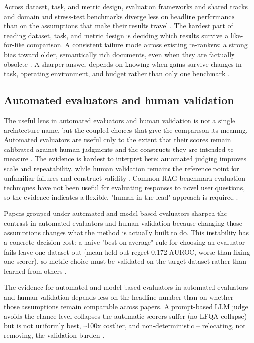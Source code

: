 \documentclass[a4paper,11pt]{article}
\begin{document}
Across dataset, task, and metric design, evaluation frameworks and shared tracks and domain and stress-test benchmarks diverge less on headline performance than on the assumptions that make their results travel \citep{Guder2026Rage,SaadFalcon2023Ares,Yao2026Authoritybench,Li2026Mrag}. The hardest part of reading dataset, task, and metric design is deciding which results survive a like-for-like comparison. A consistent failure mode across existing re-rankers: a strong bias toward older, semantically rich documents, even when they are factually obsolete \citep{An2026Fresco}. A sharper answer depends on knowing when gains survive changes in task, operating environment, and budget rather than only one benchmark \citep{Guder2026Rage,SaadFalcon2023Ares}.
\subsection{Automated evaluators and human validation}


The useful lens in automated evaluators and human validation is not a single architecture name, but the coupled choices that give the comparison its meaning. Automated evaluators are useful only to the extent that their scores remain calibrated against human judgments and the constructs they are intended to measure \citep{SaadFalcon2023Ares,Murugaraj2025Ragvue,Brehme2025Retrieval,Caruzzo2026Deceptive}. The evidence is hardest to interpret here: automated judging improves scale and repeatability, while human validation remains the reference point for unfamiliar failures and construct validity \citep{SaadFalcon2023Ares,Murugaraj2025Ragvue,Brehme2025Retrieval,Caruzzo2026Deceptive}. Common RAG benchmark evaluation techniques have not been useful for evaluating responses to novel user questions, so the evidence indicates a flexible, "human in the lead" approach is required \citep{Packowski2024Optimizing}.

Papers grouped under automated and model-based evaluators sharpen the contrast in automated evaluators and human validation because changing those assumptions changes what the method is actually built to do. This instability has a concrete decision cost: a naive "best-on-average" rule for choosing an evaluator fails leave-one-dataset-out (mean held-out regret 0.172 AUROC, worse than fixing one scorer), so metric choice must be validated on the target dataset rather than learned from others \citep{Ding2026Attribution}.

The evidence for automated and model-based evaluators in automated evaluators and human validation depends less on the headline number than on whether those assumptions remain comparable across papers. A prompt-based LLM judge avoids the chance-level collapses the automatic scorers suffer (no LFQA collapse) but is not uniformly best, \textasciitilde{}100x costlier, and non-deterministic -- relocating, not removing, the validation burden \citep{Ding2026Attribution}.
\end{document}
